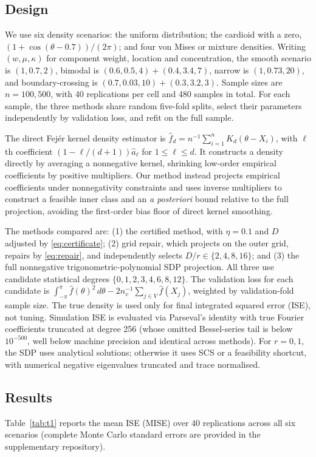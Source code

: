 \subsection{Design}
We use six density scenarios: the uniform distribution; the cardioid with a zero, \((1+\cos(\theta-0.7))/(2\pi)\); and four von Mises or mixture densities. Writing \((w,\mu,\kappa)\) for component weight, location and concentration, the smooth scenario is \((1,0.7,2)\), bimodal is \((0.6,0.5,4)+(0.4,3.4,7)\), narrow is \((1,0.73,20)\), and boundary-crossing is \((0.7,0.03,10)+(0.3,3.2,3)\). Sample sizes are \(n=100,500\), with 40 replications per cell and 480 samples in total. For each sample, the three methods share random five-fold splits, select their parameters independently by validation loss, and refit on the full sample.

The direct Fejér kernel density estimator is \(\widehat f_d=n^{-1}\sum_{i=1}^{n}K_d(\theta-X_i)\), with \(\ell\)th coefficient \((1-\ell/(d+1))\hat a_\ell\) for \(1\le\ell\le d\). It constructs a density directly by averaging a nonnegative kernel, shrinking low-order empirical coefficients by positive multipliers. Our method instead projects empirical coefficients under nonnegativity constraints and uses inverse multipliers to construct a feasible inner class and an \emph{a posteriori} bound relative to the full projection, avoiding the first-order bias floor of direct kernel smoothing.

The methods compared are: (1) the certified method, with \(\eta=0.1\) and \(D\) adjusted by \eqref{eq:certificate}; (2) grid repair, which projects on the outer grid, repairs by \eqref{eq:repair}, and independently selects \(D/r\in\{2,4,8,16\}\); and (3) the full nonnegative trigonometric-polynomial SDP projection. All three use candidate statistical degrees \(\{0,1,2,3,4,6,8,12\}\). The validation loss for each candidate is \(\int_{-\pi}^{\pi}\hat f(\theta)^2\,d\theta-2n_v^{-1}\sum_{j\in V}\hat f(X_j)\), weighted by validation-fold sample size. The true density is used only for final integrated squared error (ISE), not tuning. Simulation ISE is evaluated via Parseval's identity with true Fourier coefficients truncated at degree 256 (whose omitted Bessel-series tail is below \(10^{-500}\), well below machine precision and identical across methods). For \(r=0,1\), the SDP uses analytical solutions; otherwise it uses SCS or a feasibility shortcut, with numerical negative eigenvalues truncated and trace normalised.

\subsection{Results}
Table~\ref{tab:t1} reports the mean ISE (MISE) over 40 replications across all six scenarios (complete Monte Carlo standard errors are provided in the supplementary repository).

